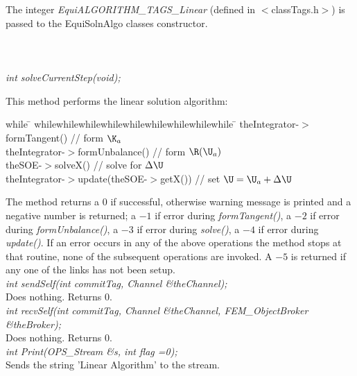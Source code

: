  \\ 
\\ 
The integer {\em EquiALGORITHM\_TAGS\_Linear} (defined in
$<$classTags.h$>$) is passed to the EquiSolnAlgo classes
constructor. \\

 \\
\\ 

  \\
{\em int solveCurrentStep(void);} 

This method performs the linear solution algorithm:
\begin{tabbing}
while \= \+ whilewhilewhilewhilewhilewhilewhilewhilewhile \= \kill
theIntegrator-$>$formTangent() \+ // form $\K_{a}$ \- \\
theIntegrator-$>$formUnbalance() // form $\R(\U_{a})$ \\
theSOE-$>$solveX() // solve for $\Delta \U$ \\
theIntegrator-$>$update(theSOE-$>$getX()) // set $\U = \U_{a} + \Delta \U$ \-  
\end{tabbing}

The method returns a 0 if successful, otherwise warning message is
printed and a negative number is returned; a $-1$ if error during {\em
formTangent()}, a $-2$ if error during {\em formUnbalance()}, a $-3$
if error during {\em solve()}, a $-4$ if error during {\em
update()}. If an error occurs in any of the above operations the
method stops at that routine, none of the subsequent operations are
invoked. A $-5$ is returned if any one of the links has not been
setup. \\


{\em int sendSelf(int commitTag, Channel \&theChannel);}\\
Does  nothing. Returns 0. \\


{\em int recvSelf(int commitTag, Channel \&theChannel, FEM\_ObjectBroker
\&theBroker);}\\ 
Does nothing. Returns 0. \\

{\em int Print(OPS_Stream \&s, int flag =0);} \\
Sends the string 'Linear Algorithm' to the stream.